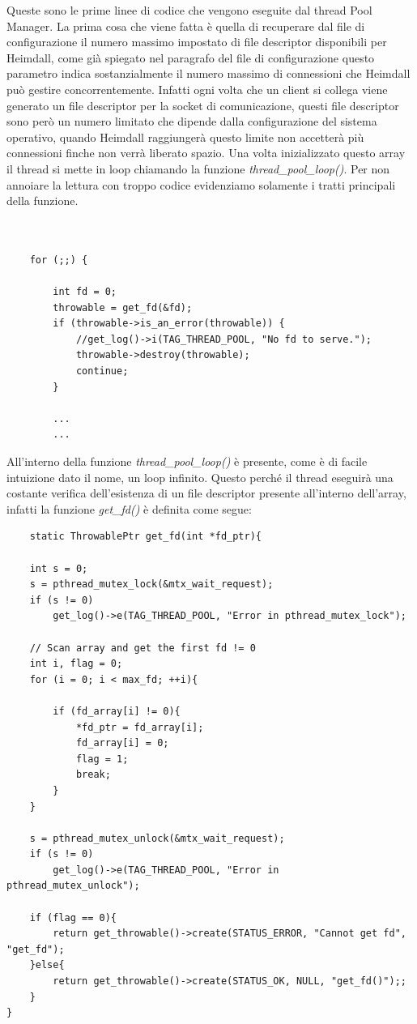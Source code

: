 \documentclass[italian]{tktltiki2}
\begin{document}
Queste sono le prime linee di codice che vengono eseguite dal thread Pool Manager. La prima cosa che viene fatta è quella di recuperare dal file di configurazione il numero massimo impostato di file descriptor disponibili per Heimdall, come già spiegato nel paragrafo del file di configurazione questo parametro indica sostanzialmente il numero massimo di connessioni che Heimdall può gestire concorrentemente. Infatti ogni volta che un client si collega viene generato un file descriptor per la socket di comunicazione, questi file descriptor sono però un numero limitato che dipende dalla configurazione del sistema operativo, quando Heimdall raggiungerà questo limite non accetterà più connessioni finche non verrà liberato spazio. Una volta inizializzato questo array il thread si mette in loop chiamando la funzione \emph{thread\_pool\_loop()}. Per non annoiare la lettura con troppo codice evidenziamo solamente i tratti principali della funzione.\\\\

\begin{lstlisting}

	for (;;) {

		int fd = 0;
        throwable = get_fd(&fd);
        if (throwable->is_an_error(throwable)) {
            //get_log()->i(TAG_THREAD_POOL, "No fd to serve.");
            throwable->destroy(throwable);
            continue;
        }
        
       	...
       	...	
\end{lstlisting}

All'interno della funzione \emph{thread\_pool\_loop()} è presente, come è di facile intuizione dato il nome, un loop infinito. Questo perché il thread eseguirà una costante verifica dell'esistenza di un file descriptor presente all'interno dell'array, infatti la funzione \emph{get\_fd()} è definita come segue:

\begin{lstlisting}
	static ThrowablePtr get_fd(int *fd_ptr){

	int s = 0;
	s = pthread_mutex_lock(&mtx_wait_request);
	if (s != 0)
		get_log()->e(TAG_THREAD_POOL, "Error in pthread_mutex_lock");

    // Scan array and get the first fd != 0
    int i, flag = 0;
    for (i = 0; i < max_fd; ++i){

        if (fd_array[i] != 0){
            *fd_ptr = fd_array[i];
            fd_array[i] = 0;
            flag = 1;
            break;
        }
    }

	s = pthread_mutex_unlock(&mtx_wait_request); 
	if (s != 0)
		get_log()->e(TAG_THREAD_POOL, "Error in pthread_mutex_unlock");

    if (flag == 0){
        return get_throwable()->create(STATUS_ERROR, "Cannot get fd", "get_fd");        
    }else{
        return get_throwable()->create(STATUS_OK, NULL, "get_fd()");;
    }
}
\end{lstlisting}
\end{document}
